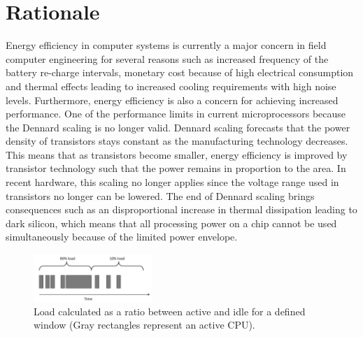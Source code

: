 \documentclass{article}
\begin{document}
\date{\today} %


\section{Rationale}
Energy efficiency in computer systems is currently a major concern in field computer engineering for several reasons such as increased frequency of the battery re-charge intervals, 
monetary cost because of high electrical consumption and thermal effects leading to increased cooling requirements with high noise levels. 
Furthermore, energy efficiency is also a concern for achieving increased performance.
One of the performance limits in current microprocessors because the Dennard scaling \cite{Dennard:74} is no longer valid. 
Dennard scaling forecasts that the power density of transistors stays constant as the manufacturing technology decreases. 
This means that as transistors become smaller, energy efficiency is improved by transistor technology such that the power remains in proportion to the area. 
In recent hardware, this scaling no longer applies since the voltage range used in transistors no longer can be lowered. 
The end of Dennard scaling brings consequences such as an disproportional increase in thermal dissipation leading to dark silicon, 
which means that all processing power on a chip cannot be used simultaneously because of the limited power envelope.\\

\begin{figure}
  \begin{center}
    \vspace{-1cm}
    \includegraphics[width=0.4\textwidth]{fig/workload.png}
  \end{center}
  \caption{Load calculated as a ratio between active and idle for a defined window (Gray rectangles represent an active CPU).}
  \label{fig:workload}
\end{figure}
\end{document}
